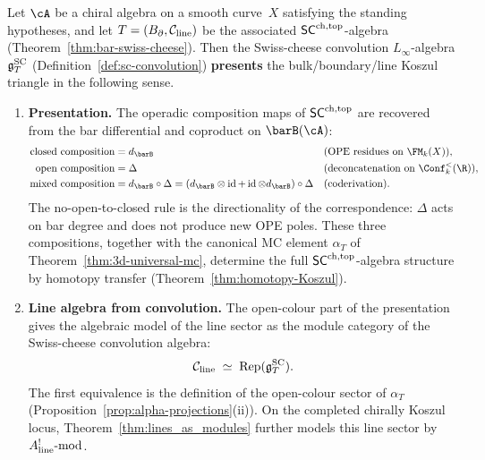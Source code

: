 \begin{theorem}
Let $\cA$ be a chiral algebra on a smooth curve~$X$ satisfying the
standing hypotheses, and let $T = (B_{\partial}, \mathcal C_{\mathrm{line}})$
be the associated $\mathsf{SC}^{\mathrm{ch,top}}$-algebra
\textup{(}Theorem~\textup{\ref{thm:bar-swiss-cheese}}\textup{)}.
Then the Swiss-cheese convolution $L_\infty$-algebra $\mathfrak{g}^{\mathrm{SC}}_T$
\textup{(}Definition~\textup{\ref{def:sc-convolution}}\textup{)}
\textbf{presents} the bulk/boundary/line Koszul triangle in the
following sense.
\begin{enumerate}[label=\textup{(\roman*)}]
\item \textbf{Presentation.}
 The operadic composition maps of $\mathsf{SC}^{\mathrm{ch,top}}$ are recovered from the
 bar differential and coproduct on $\barB(\cA)$:
 \begin{align*}
 \text{closed composition}
 &= d_{\barB}
 &&\text{\textup{(}OPE residues on $\FM_k(X)$\textup{)}},\\
 \text{open composition}
 &= \Delta
 &&\text{\textup{(}deconcatenation on $\Conf_k^{<}(\R)$\textup{)}},\\
 \text{mixed composition}
 &= d_{\barB}\circ\Delta
 = (d_{\barB}\otimes\id + \id\otimes d_{\barB})\circ\Delta
 &&\text{\textup{(}coderivation\textup{)}}.
 \end{align*}
 The no-open-to-closed rule is the directionality of the
 correspondence: $\Delta$ acts on bar degree and does not produce
 new OPE poles. These three compositions, together with the
 canonical MC element $\alpha_T$ of
 Theorem~\textup{\ref{thm:3d-universal-mc}}, determine the full
 $\mathsf{SC}^{\mathrm{ch,top}}$-algebra structure by homotopy transfer
 \textup{(}Theorem~\textup{\ref{thm:homotopy-Koszul}}\textup{)}.

\item \textbf{Line algebra from convolution.}
 The open-colour part of the presentation gives the algebraic model
 of the line sector as the module category of the Swiss-cheese
 convolution algebra:
 \[
 \mathcal C_{\mathrm{line}}
 \;\simeq\;
 \mathrm{Rep}(\mathfrak{g}^{\mathrm{SC}}_T).
 \]
 The first equivalence is the definition of the open-colour sector
 of $\alpha_T$
 \textup{(}Proposition~\textup{\ref{prop:alpha-projections}(ii)}\textup{)}.
 On the completed chirally Koszul locus,
 Theorem~\textup{\ref{thm:lines_as_modules}} further models this line
 sector by
 $A^!_{\mathrm{line}}\textup{-mod}$.


\end{enumerate}
\end{theorem}
